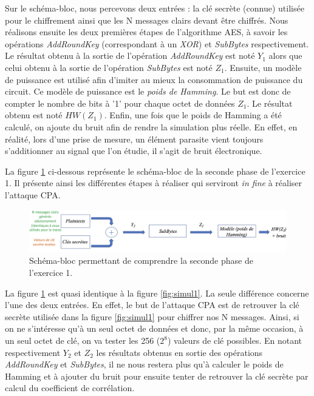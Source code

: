 \documentclass[10pt, oneside, a4paper]{article}
\begin{document}
\vspace{-0.4 cm}Sur le schéma-bloc, nous percevons deux entrées : la clé secrète (connue) utilisée pour le chiffrement ainsi que les N messages clairs devant être chiffrés. Nous réalisons ensuite les deux premières étapes de l'algorithme AES, à savoir les opérations \textit{AddRoundKey} (correspondant à un \textit{XOR}) et \textit{SubBytes} respectivement. Le résultat obtenu à la sortie de l'opération \textit{AddRoundKey} est noté \textit{$Y_1$} alors que celui obtenu à la sortie de l'opération \textit{SubBytes} est noté \textit{$Z_1$}. Ensuite, un modèle de puissance est utilisé afin d'imiter au mieux la consommation de puissance du circuit. Ce modèle de puissance est le \textit{poids de Hamming}. Le but est donc de compter le nombre de bits à '1' pour chaque octet de données \textit{$Z_1$}. Le résultat obtenu est noté \textit{$HW(Z_1)$}. Enfin, une fois que le poids de Hamming a été calculé, on ajoute du bruit afin de rendre la simulation plus réelle. En effet, en réalité, lors d'une prise de mesure, un élément parasite vient toujours s'additionner au signal que l'on étudie, il s'agit de bruit électronique.

La figure \ref{fig:simul2} ci-dessous représente le schéma-bloc de la seconde phase de l'exercice 1. Il présente ainsi les différentes étapes à réaliser qui serviront \textit{in fine} à réaliser l'attaque CPA.
\begin{figure}[htbp]
    \centering
    \includegraphics[scale=0.45]{image/simul2}
    \caption{Schéma-bloc permettant de comprendre la seconde phase de l'exercice 1.}
    \label{fig:simul2} 
\end{figure}

\vspace{-0.4 cm}La figure \ref{fig:simul2} est quasi identique à la figure \ref{fig:simul1}. La seule différence concerne l'une des deux entrées. En effet, le but de l'attaque CPA est de retrouver la clé secrète utilisée dans la figure \ref{fig:simul1} pour chiffrer nos N messages. Ainsi, si on ne s'intéresse qu'à un seul octet de données et donc, par la même occasion, à un seul octet de clé, on va tester les 256 ($2^8$) valeurs de clé possibles. En notant respectivement $Y_2$ et $Z_2$ les résultats obtenus en sortie des opérations \textit{AddRoundKey} et \textit{SubBytes}, il ne nous restera plus qu'à calculer le poids de Hamming et à ajouter du bruit pour ensuite tenter de retrouver la clé secrète par calcul du coefficient de corrélation.
\end{document}
